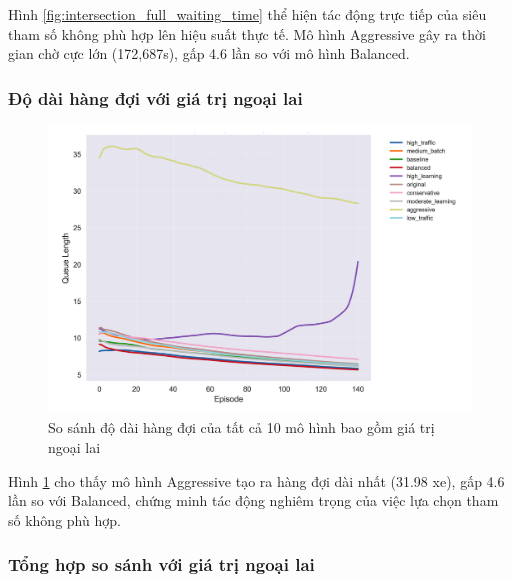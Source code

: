 Hình \ref{fig:intersection_full_waiting_time} thể hiện tác động trực tiếp của
siêu tham số không phù hợp lên hiệu suất thực tế. Mô hình Aggressive gây ra thời
gian chờ cực lớn (172,687s), gấp 4.6 lần so với mô hình Balanced.

\subsubsection{Độ dài hàng đợi với giá trị ngoại lai}

\begin{figure}[!htp]
    \centering
    \includegraphics[width=\textwidth]{
        figures/individual_plots/intersection_full_queue_length.png
    }
    \caption{So sánh độ dài hàng đợi của tất cả 10 mô hình bao gồm giá trị ngoại lai}
    \label{fig:intersection_full_queue_length}
\end{figure}

Hình \ref{fig:intersection_full_queue_length} cho thấy mô hình Aggressive tạo ra
hàng đợi dài nhất (31.98 xe), gấp 4.6 lần so với Balanced, chứng minh tác động
nghiêm trọng của việc lựa chọn tham số không phù hợp.

\subsubsection{Tổng hợp so sánh với giá trị ngoại lai}

